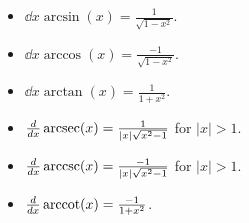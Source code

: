 \documentclass{ximera}
\begin{document}
\begin{theorem} \hfil
\begin{itemize}
\item $\dd{x} \arcsin(x) = \frac{1}{\sqrt{1-x^2}}$.
\item $\dd{x} \arccos(x) = \frac{-1}{\sqrt{1-x^2}}$.
\item $\dd{x} \arctan(x) = \frac{1}{1+x^2}$.
\item $\frac{d }{d x} \operatorname{arcsec}(x) = \frac{1}{|x|\sqrt{x^2-1}}$ for $|x|>1$.
\item $\frac{d }{d x} \operatorname{arccsc}(x) = \frac{-1}{|x|\sqrt{x^2-1}}$ for $|x|>1$.
\item $\frac{d }{d x} \operatorname{arccot}(x) = \frac{-1}{1+x^2}$.
\end{itemize}
\end{theorem}
\end{document}

